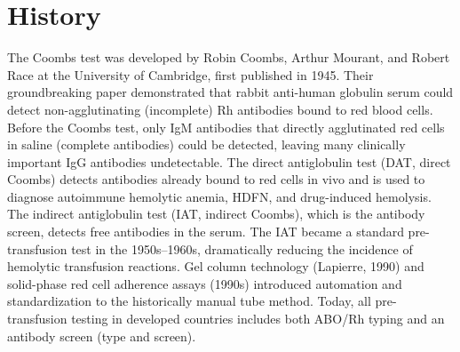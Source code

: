 \section*{History}
The Coombs test was developed by Robin Coombs, Arthur Mourant, and Robert Race at the University of Cambridge, first published in 1945. Their groundbreaking paper demonstrated that rabbit anti-human globulin serum could detect non-agglutinating (incomplete) Rh antibodies bound to red blood cells. Before the Coombs test, only IgM antibodies that directly agglutinated red cells in saline (complete antibodies) could be detected, leaving many clinically important IgG antibodies undetectable. The direct antiglobulin test (DAT, direct Coombs) detects antibodies already bound to red cells in vivo and is used to diagnose autoimmune hemolytic anemia, HDFN, and drug-induced hemolysis. The indirect antiglobulin test (IAT, indirect Coombs), which is the antibody screen, detects free antibodies in the serum. The IAT became a standard pre-transfusion test in the 1950s--1960s, dramatically reducing the incidence of hemolytic transfusion reactions. Gel column technology (Lapierre, 1990) and solid-phase red cell adherence assays (1990s) introduced automation and standardization to the historically manual tube method. Today, all pre-transfusion testing in developed countries includes both ABO/Rh typing and an antibody screen (type and screen).

